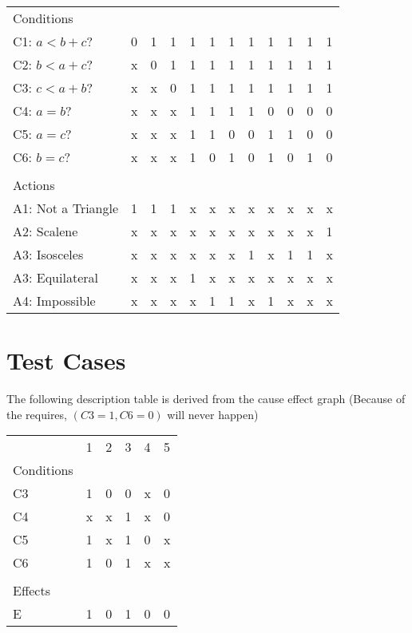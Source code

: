 \documentclass[letterpaper]{article}
\begin{document}
\begin{adjustbox}{center}
	\begin{tabular}{llllllllllll}
		Conditions         &   &   &   &   &   &   &   &   &   &   &   \\ \cline{1-1}
		C1: $a<b+c$?       & 0 & 1 & 1 & 1 & 1 & 1 & 1 & 1 & 1 & 1 & 1 \\
		C2: $b<a+c$?       & x & 0 & 1 & 1 & 1 & 1 & 1 & 1 & 1 & 1 & 1 \\
		C3: $c<a+b$?       & x & x & 0 & 1 & 1 & 1 & 1 & 1 & 1 & 1 & 1 \\
		C4: $a=b$?         & x & x & x & 1 & 1 & 1 & 1 & 0 & 0 & 0 & 0 \\
		C5: $a=c$?         & x & x & x & 1 & 1 & 0 & 0 & 1 & 1 & 0 & 0 \\
		C6: $b=c$?         & x & x & x & 1 & 0 & 1 & 0 & 1 & 0 & 1 & 0 \\
		                   &   &   &   &   &   &   &   &   &   &   &   \\
		Actions            &   &   &   &   &   &   &   &   &   &   &   \\ \cline{1-1}
		A1: Not a Triangle & 1 & 1 & 1 & x & x & x & x & x & x & x & x \\
		A2: Scalene        & x & x & x & x & x & x & x & x & x & x & 1 \\
		A3: Isosceles      & x & x & x & x & x & x & 1 & x & 1 & 1 & x \\
		A3: Equilateral    & x & x & x & 1 & x & x & x & x & x & x & x \\
		A4: Impossible     & x & x & x & x & 1 & 1 & x & 1 & x & x & x \\
	\end{tabular}
\end{adjustbox}


\section{Test Cases}
The following description table is derived from the cause effect graph
(Because of the requires, $(C3=1, C6=0)$ will never happen)
\vspace{20pt}
\begin{adjustbox}{center}
	\begin{tabular}{llllll}
		           & 1 & 2 & 3 & 4 & 5 \\ \cline{2-6}
		Conditions &   &   &   &   &   \\ \cline{1-1}
		C3         & 1 & 0 & 0 & x & 0 \\
		C4         & x & x & 1 & x & 0 \\
		C5         & 1 & x & 1 & 0 & x \\
		C6         & 1 & 0 & 1 & x & x \\
		           &   &   &   &   &   \\
		Effects    &   &   &   &   &   \\ \cline{1-1}
		E          & 1 & 0 & 1 & 0 & 0 \\
	\end{tabular}
\end{adjustbox}
\vspace{20pt}
\end{document}
